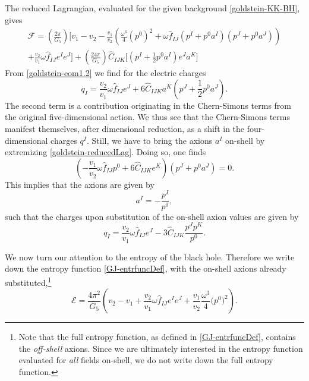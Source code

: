 \documentclass[12pt,twoside]{book}
\begin{document}
The reduced Lagrangian, evaluated for the given background \eqref{goldstein-KK-BH}, gives \cite{Goldstein:2007kx}
\begin{multline}\label{goldstein-reducedLag}
\mathcal{F} = \left(
\frac{2\pi}{G_{5}} \right)\Bigg[ v_{1} -v_{2}
- \frac{v_{1}}{v_{2}}\left( \frac{\omega^{3}}{4}(p^{0})^{2}
+ \omega \hat{f}_{IJ}(p^{I} + p^{0}a^{I})(p^{J} + p^{0}a^{J}) \right)\\
+ \frac{v_{2}}{v_{1}} \omega\hat{f}_{IJ} e^{I}e^{J} \Bigg]
+ \left( \frac{24\pi}{G_{5}} \right) \hat{C}_{IJK} \big[ ( p^{I} + \frac{1}{2}p^{0}a^{I}) e^{J}a^{K} \big]
\end{multline}
From \eqref{goldstein-eom1.2} we find for the electric charges
\begin{equation}
q_{I} = \frac{v_{2}}{v_{1}}\omega \hat{f}_{IJ}e^{J} + 6 \hat{C}_{IJK} a^{K}(p^{J} + \frac{1}{2}p^{0}a^{J}).
\end{equation} 
The second term is a contribution originating in the Chern-Simons terms from the original five-dimensional action. We thus see that the Chern-Simons terms manifest themselves, after dimensional reduction, as a shift in the four\hyp{}dimensional charges $q^{I}$. Still, we have to bring the axions $a^{I}$ on-shell by extremizing \eqref{goldstein-reducedLag}. Doing so, one finds
\begin{equation}\label{GJ:eomAxions}
(- \frac{v_{1}}{v_{2}}\omega\hat{f}_{IJ} p^{0} + 6\hat{C}_{IJK}e^{K})(p^{J}+p^{0}a^{J})  = 0.
\end{equation}
This implies that the axions are given by
\begin{equation}
a^{I} = -\frac{p^{I}}{p^{0}},
\end{equation}
such that the charges upon substitution of the on-shell axion values are given by
\begin{equation}\label{GJ:onshellCharge}
q_{I} = \frac{v_{2}}{v_{1}}\omega \hat{f}_{IJ}e^{J} - 3 \hat{C}_{IJK} \frac{p^{J}p^{K}}{p^{0}}.
\end{equation}

We now turn our attention to the entropy of the black hole. Therefore we write down the entropy function \eqref{GJ-entrfuncDef}, with the on-shell axions already substituted,\footnote{
Note that the full entropy function, as defined in \eqref{GJ-entrfuncDef}, contains the \emph{off-shell} axions. Since we are ultimately interested in the entropy function evaluated for \emph{all} fields on-shell, we do not write down the full entropy function.
}
\begin{equation}\label{GJ:entropyFunc}
\mathcal{E} = \frac{4\pi^{2}}{G_{5}}\left(
v_{2} - v_{1} + \frac{v_{2}}{v_{1}}\omega \hat{f}_{IJ} e^{I} e^{J}
+ \frac{v_{1}}{v_{2}} \frac{\omega^{3}}{4} \big( p^{0} \big)^{2}
\right).
\end{equation}
\end{document}
